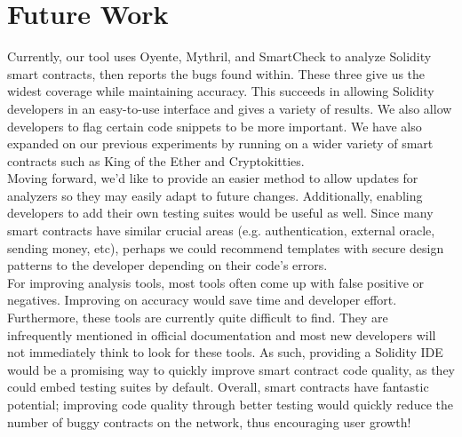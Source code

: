 \section{Future Work}

Currently, our tool uses Oyente, Mythril, and SmartCheck to analyze Solidity smart contracts, then reports the bugs found within. These three give us the widest coverage while maintaining accuracy. This succeeds in allowing Solidity developers in an easy-to-use interface and gives a variety of results. We also allow developers to flag certain code snippets to be more important. We have also expanded on our previous experiments by running on a wider variety of smart contracts such as King of the Ether and Cryptokitties. \\

Moving forward, we'd like to provide an easier method to allow updates for analyzers so they may easily adapt to future changes. Additionally, enabling developers to add their own testing suites would be useful as well. Since many smart contracts have similar crucial areas (e.g. authentication, external oracle, sending money, etc), perhaps we could recommend templates with secure design patterns to the developer depending on their code's errors. \\

For improving analysis tools, most tools often come up with false positive or negatives. Improving on accuracy would save time and developer effort. Furthermore, these tools are currently quite difficult to find. They are infrequently mentioned in official documentation and most new developers will not immediately think to look for these tools. As such, providing a Solidity IDE would be a promising way to quickly improve smart contract code quality, as they could embed testing suites by default. Overall, smart contracts have fantastic potential; improving code quality through better testing would quickly reduce the number of buggy contracts on the network, thus encouraging user growth!  

